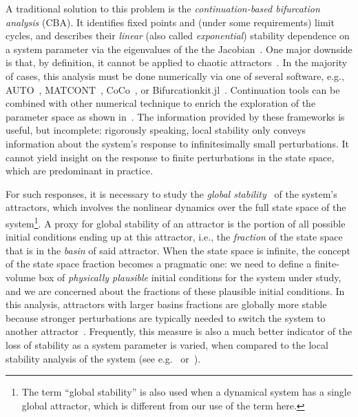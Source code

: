 \documentclass[%
 aip,
 amsmath,amssymb,
 reprint,%
]{revtex4-1}
\begin{document}
A traditional solution to this problem is the \emph{continuation-based bifurcation analysis} (CBA). It identifies fixed points and (under some requirements) limit cycles, and describes their \emph{linear} (also called \emph{exponential}) stability dependence on a system parameter via the eigenvalues of the the Jacobian~\cite{DatserisBook}. One major downside is that, by definition, it cannot be applied to chaotic attractors~\cite{DatserisBook}. In the majority of cases, this analysis must be done numerically via one of several software, e.g., AUTO~\cite{doedel1981auto}, MATCONT~\cite{dhooge2003matcont}, CoCo~\cite{Dankowicz2013}, or Bifurcationkit.jl~\cite{veltz:hal-02902346}. Continuation tools can be combined with other numerical technique to enrich the exploration of the parameter space as shown in~\cite{PUSULURI2021105503}. The information provided by these frameworks is useful, but incomplete: rigorously speaking, local stability only conveys information about the system's response to infinitesimally small perturbations. It cannot yield insight on the response to finite perturbations in the state space, which are predominant in practice.

For such responses, it is necessary to study the \emph{global stability}~\cite{Menck2013} of the system's attractors, which involves the nonlinear dynamics over the full state space of the system\footnote{The term ``global stability'' is also used when a dynamical system has a single global attractor, which is different from our use of the term here.}. A proxy for global stability of an attractor is the portion of all possible initial conditions ending up at this attractor, i.e., the \emph{fraction} of the state space that is in the \emph{basin} of said attractor. When the state space is infinite, the concept of the state space fraction becomes a pragmatic one: we need to define a finite-volume box of \emph{physically plausible} initial conditions for the system under study, and we are concerned about the fractions of these plausible initial conditions. In this analysis, attractors with larger basins fractions are globally more stable because stronger perturbations are typically needed to switch the system to another attractor~\cite{Menck2013}. Frequently, this measure is also a much better indicator of the loss of stability as a system parameter is varied, when compared to the local stability analysis of the system (see e.g.~\cite{Menck2013} or~\cite[Chap. 12]{DatserisBook}).
\end{document}

